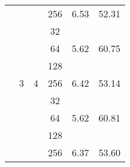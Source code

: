 \begin{longtable}{cccccc}
                      & \multirow{-4}{*}{\cellcolor[HTML]{EFEFEF}{  2}} & \multirow{-4}{*}{\cellcolor[HTML]{EFEFEF}{  6}} & 256                                             & {  6.53}                             & {  52.31}                            \\ \cline{2-6}
                      & {  }                                            & {  }                                            & \cellcolor[HTML]{EFEFEF}32                      & \cellcolor[HTML]{EFEFEF}{  6.37}     & \cellcolor[HTML]{EFEFEF}{  53.62}    \\
                      & {  }                                            & {  }                                            & 64                                              & {  5.62}                             & {  60.75}                            \\
                      & {  }                                            & {  }                                            & \cellcolor[HTML]{EFEFEF}128                     & \cellcolor[HTML]{EFEFEF}{  5.82}     & \cellcolor[HTML]{EFEFEF}{  58.71}    \\
                      & \multirow{-4}{*}{{  3}}                         & \multirow{-4}{*}{{  4}}                         & 256                                             & {  6.42}                             & {  53.14}                            \\ \cline{2-6}
                      & \cellcolor[HTML]{EFEFEF}{  }                    & \cellcolor[HTML]{EFEFEF}{  }                    & \cellcolor[HTML]{EFEFEF}32                      & \cellcolor[HTML]{EFEFEF}{  6.37}     & \cellcolor[HTML]{EFEFEF}{  53.61}    \\
                      & \cellcolor[HTML]{EFEFEF}{  }                    & \cellcolor[HTML]{EFEFEF}{  }                    & 64                                              & {  5.62}                             & {  60.81}                            \\
                      & \cellcolor[HTML]{EFEFEF}{  }                    & \cellcolor[HTML]{EFEFEF}{  }                    & \cellcolor[HTML]{EFEFEF}128                     & \cellcolor[HTML]{EFEFEF}{  5.73}     & \cellcolor[HTML]{EFEFEF}{  59.61}    \\
                      & \multirow{-4}{*}{\cellcolor[HTML]{EFEFEF}{  4}} & \multirow{-4}{*}{\cellcolor[HTML]{EFEFEF}{  3}} & 256                                             & {  6.37}                             & {  53.60}                            \\ \cline{2-6}

\end{longtable}
